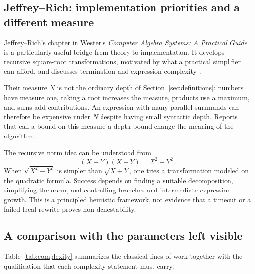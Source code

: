 \documentclass[11pt,oneside]{article}
\numberwithin{equation}{section}
\theoremstyle{definition}
\theoremstyle{remark}
\begin{document}
\subsection{Jeffrey--Rich: implementation priorities and a different measure}
Jeffrey--Rich's chapter in Wester's \emph{Computer Algebra Systems: A Practical Guide} is a particularly useful bridge from theory to implementation. It develops recursive square-root transformations, motivated by what a practical simplifier can afford, and discusses termination and expression complexity \cite{jeffrey}.

Their measure $N$ is not the ordinary depth of Section~\ref{sec:definitions}: numbers have measure one, taking a root increases the measure, products use a maximum, and sums add contributions. An expression with many parallel summands can therefore be expensive under $N$ despite having small syntactic depth. Reports that call a bound on this measure a depth bound change the meaning of the algorithm.

The recursive norm idea can be understood from
\[
(X+Y)(X-Y)=X^2-Y^2.
\]
When $\sqrt{X^2-Y^2}$ is simpler than $\sqrt{X+Y}$, one tries a transformation modeled on the quadratic formula. Success depends on finding a suitable decomposition, simplifying the norm, and controlling branches and intermediate expression growth. This is a principled heuristic framework, not evidence that a timeout or a failed local rewrite proves non-denestability.

\subsection{A comparison with the parameters left visible}
Table~\ref{tab:complexity} summarizes the classical lines of work together with the qualification that each complexity statement must carry.
\end{document}
